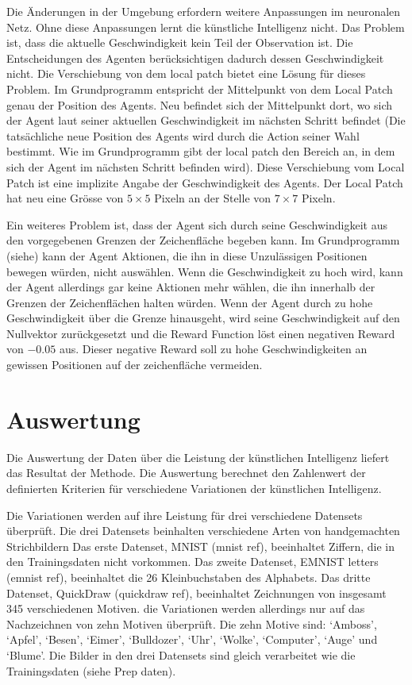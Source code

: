 Die Änderungen in der Umgebung erfordern weitere Anpassungen im neuronalen Netz.
Ohne diese Anpassungen lernt die künstliche Intelligenz nicht. Das Problem ist,
dass die aktuelle Geschwindigkeit kein Teil der Observation ist. Die
Entscheidungen des Agenten berücksichtigen dadurch dessen Geschwindigkeit nicht.
Die Verschiebung von dem local patch bietet eine Lösung für dieses Problem. Im
Grundprogramm entspricht der Mittelpunkt von dem Local Patch genau der Position
des Agents. Neu befindet sich der Mittelpunkt dort, wo sich der Agent laut
seiner aktuellen Geschwindigkeit im nächsten Schritt befindet (Die tatsächliche
neue Position des Agents wird durch die Action seiner Wahl bestimmt. Wie im
Grundprogramm gibt der local patch den Bereich an, in dem sich der Agent im
nächsten Schritt befinden wird). Diese Verschiebung vom Local Patch ist eine
implizite Angabe der Geschwindigkeit des Agents. Der Local Patch hat neu eine
Grösse von $5\times5$ Pixeln an der Stelle von $7\times7$ Pixeln.


Ein weiteres Problem ist, dass der Agent sich durch seine Geschwindigkeit aus
den vorgegebenen Grenzen der Zeichenfläche begeben kann. Im Grundprogramm  
(siehe) kann der Agent Aktionen, die ihn in diese Unzulässigen Positionen  %
bewegen würden, nicht auswählen. Wenn die Geschwindigkeit zu hoch wird, kann der
Agent allerdings gar keine Aktionen mehr wählen, die ihn innerhalb der Grenzen der
Zeichenflächen halten würden. Wenn der Agent durch zu hohe Geschwindigkeit über
die Grenze hinausgeht, wird seine Geschwindigkeit auf den Nullvektor
zurückgesetzt und die Reward Function löst einen negativen Reward von $-0.05$
aus. Dieser negative Reward soll zu hohe Geschwindigkeiten an gewissen
Positionen auf der zeichenfläche vermeiden.


\section{Auswertung}
\label{chap:m_auswert}
Die Auswertung der Daten über die Leistung der künstlichen Intelligenz liefert
das Resultat der Methode. Die Auswertung berechnet den Zahlenwert der
definierten Kriterien für verschiedene Variationen der künstlichen Intelligenz.

Die Variationen werden auf ihre Leistung für drei verschiedene Datensets
überprüft. Die drei Datensets beinhalten verschiedene Arten von handgemachten
Strichbildern Das erste Datenset, MNIST (mnist ref),  beeinhaltet Ziffern, die
in den Trainingsdaten nicht vorkommen. Das zweite Datenset, EMNIST letters
(emnist ref), beeinhaltet die 26 Kleinbuchstaben des Alphabets. Das dritte
Datenset, QuickDraw (quickdraw ref), beeinhaltet Zeichnungen von insgesamt 345
verschiedenen Motiven. die Variationen werden allerdings nur auf das
Nachzeichnen von zehn Motiven überprüft. Die zehn Motive sind: `Amboss',
`Apfel', `Besen', `Eimer', `Bulldozer', `Uhr', `Wolke', `Computer', `Auge' und
`Blume'. Die Bilder in den drei Datensets sind gleich verarbeitet wie die
Trainingsdaten (siehe Prep daten). 

